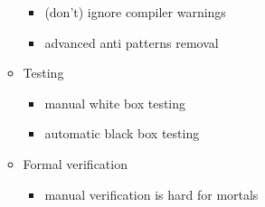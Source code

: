 \begin{frame}
\begin{itemize}
\begin{itemize}
\begin{itemize}
\item (don't) ignore compiler warnings

\item advanced anti patterns removal

\end{itemize}

\item<4-> Testing

\begin{itemize}

\item manual white box testing

\item automatic black box testing

\end{itemize}

\item<5-> Formal verification

\begin{itemize}

\item manual verification is hard for mortals


\end{itemize}
\end{itemize}
\end{itemize}
\end{frame}
